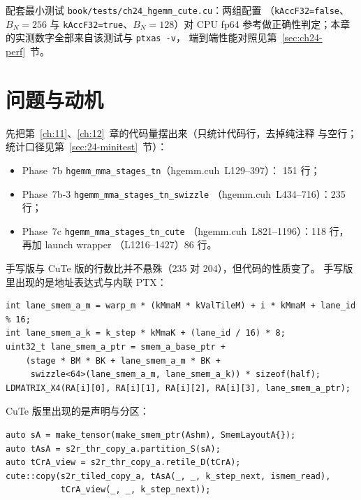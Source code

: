 配套最小测试 \texttt{book/\allowbreak{}tests/\allowbreak{}ch24\_\allowbreak{}hgemm\_\allowbreak{}cute.cu}：两组配置
（\texttt{k\allowbreak{}Acc\allowbreak{}F32=\allowbreak{}false}、$B_N=256$ 与 \texttt{k\allowbreak{}Acc\allowbreak{}F32=\allowbreak{}true}、$B_N=128$）对 CPU
fp64 参考做正确性判定；本章的实测数字全部来自该测试与 \texttt{ptxas -v}，
端到端性能对照见第~\ref{sec:ch24-perf}~节。

\section{问题与动机}

先把第~\ref{ch:11}、\ref{ch:12}~章的代码量摆出来（只统计代码行，去掉纯注释
与空行；统计口径见第~\ref{sec:24-minitest}~节）：

\begin{itemize}
  \item Phase~7b \texttt{hgemm\_\allowbreak{}mma\_\allowbreak{}stages\_\allowbreak{}tn}（hgemm.cuh~L129--397）：
        151 行；
  \item Phase~7b-3 \texttt{hgemm\_\allowbreak{}mma\_\allowbreak{}stages\_\allowbreak{}tn\_\allowbreak{}swizzle}
        （hgemm.cuh~L434--716）：235 行；
  \item Phase~7c \texttt{hgemm\_\allowbreak{}mma\_\allowbreak{}stages\_\allowbreak{}tn\_\allowbreak{}cute}
        （hgemm.cuh~L821--1196）：118 行，再加 launch wrapper
        （L1216--1427）86 行。
\end{itemize}

手写版与 CuTe 版的行数比并不悬殊（235 对 204），但代码的性质变了。
手写版里出现的是地址表达式与内联 PTX：

\begin{lstlisting}
int lane_smem_a_m = warp_m * (kMmaM * kValTileM) + i * kMmaM + lane_id % 16;
int lane_smem_a_k = k_step * kMmaK + (lane_id / 16) * 8;
uint32_t lane_smem_a_ptr = smem_a_base_ptr +
    (stage * BM * BK + lane_smem_a_m * BK +
     swizzle<64>(lane_smem_a_m, lane_smem_a_k)) * sizeof(half);
LDMATRIX_X4(RA[i][0], RA[i][1], RA[i][2], RA[i][3], lane_smem_a_ptr);
\end{lstlisting}

CuTe 版里出现的是声明与分区：

\begin{lstlisting}
auto sA = make_tensor(make_smem_ptr(Ashm), SmemLayoutA{});
auto tAsA = s2r_thr_copy_a.partition_S(sA);
auto tCrA_view = s2r_thr_copy_a.retile_D(tCrA);
cute::copy(s2r_tiled_copy_a, tAsA(_, _, k_step_next, ismem_read),
           tCrA_view(_, _, k_step_next));
\end{lstlisting}

